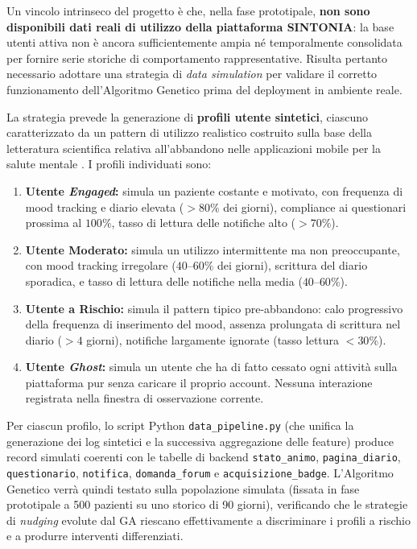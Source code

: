 Un vincolo intrinseco del progetto è che, nella fase prototipale, \textbf{non sono disponibili dati reali di utilizzo della piattaforma SINTONIA}: la base utenti attiva non è ancora sufficientemente ampia né temporalmente consolidata per fornire serie storiche di comportamento rappresentative. Risulta pertanto necessario adottare una strategia di \textit{data simulation} per validare il corretto funzionamento dell'Algoritmo Genetico prima del deployment in ambiente reale.

La strategia prevede la generazione di \textbf{profili utente sintetici}, ciascuno caratterizzato da un pattern di utilizzo realistico costruito sulla base della letteratura scientifica relativa all'abbandono nelle applicazioni mobile per la salute mentale \cite{baumel2019mhealth}. I profili individuati sono:

\begin{enumerate}
    \item \textbf{Utente \textit{Engaged}:} simula un paziente costante e motivato, con frequenza di mood tracking e diario elevata ($> 80\%$ dei giorni), compliance ai questionari prossima al $100\%$, tasso di lettura delle notifiche alto ($> 70\%$).
    \item \textbf{Utente Moderato:} simula un utilizzo intermittente ma non preoccupante, con mood tracking irregolare ($40$--$60\%$ dei giorni), scrittura del diario sporadica, e tasso di lettura delle notifiche nella media ($40$--$60\%$).
    \item \textbf{Utente a Rischio:} simula il pattern tipico pre-abbandono: calo progressivo della frequenza di inserimento del mood, assenza prolungata di scrittura nel diario ($> 4$ giorni), notifiche largamente ignorate (tasso lettura $< 30\%$).
    \item \textbf{Utente \textit{Ghost}:} simula un utente che ha di fatto cessato ogni attività sulla piattaforma pur senza caricare il proprio account. Nessuna interazione registrata nella finestra di osservazione corrente.
\end{enumerate}

Per ciascun profilo, lo script Python \texttt{data\_pipeline.py} (che unifica la generazione dei log sintetici e la successiva aggregazione delle feature) produce record simulati coerenti con le tabelle di backend \texttt{stato\_animo}, \texttt{pagina\_diario}, \texttt{questionario}, \texttt{notifica}, \texttt{domanda\_forum} e \texttt{acquisizione\_badge}. 
L'Algoritmo Genetico verrà quindi testato sulla popolazione simulata (fissata in fase prototipale a 500 pazienti su uno storico di 90 giorni), verificando che le strategie di \textit{nudging} evolute dal GA riescano effettivamente a discriminare i profili a rischio e a produrre interventi differenziati.

